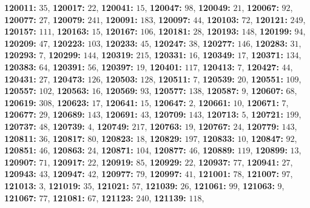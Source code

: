 \textsf{\bfseries 120011:} $35$, \textsf{\bfseries 120017:} $22$, \textsf{\bfseries 120041:} $15$, \textsf{\bfseries 120047:} $98$, \textsf{\bfseries 120049:} $21$, \textsf{\bfseries 120067:} $92$, \textsf{\bfseries 120077:} $27$, \textsf{\bfseries 120079:} $241$, \textsf{\bfseries 120091:} $183$, \textsf{\bfseries 120097:} $44$, \textsf{\bfseries 120103:} $72$, \textsf{\bfseries 120121:} $249$, \textsf{\bfseries 120157:} $111$, \textsf{\bfseries 120163:} $15$, \textsf{\bfseries 120167:} $106$, \textsf{\bfseries 120181:} $28$, \textsf{\bfseries 120193:} $148$, \textsf{\bfseries 120199:} $94$, \textsf{\bfseries 120209:} $47$, \textsf{\bfseries 120223:} $103$, \textsf{\bfseries 120233:} $45$, \textsf{\bfseries 120247:} $38$, \textsf{\bfseries 120277:} $146$, \textsf{\bfseries 120283:} $31$, \textsf{\bfseries 120293:} $7$, \textsf{\bfseries 120299:} $144$, \textsf{\bfseries 120319:} $215$, \textsf{\bfseries 120331:} $16$, \textsf{\bfseries 120349:} $17$, \textsf{\bfseries 120371:} $134$, \textsf{\bfseries 120383:} $64$, \textsf{\bfseries 120391:} $56$, \textsf{\bfseries 120397:} $19$, \textsf{\bfseries 120401:} $117$, \textsf{\bfseries 120413:} $7$, \textsf{\bfseries 120427:} $44$, \textsf{\bfseries 120431:} $27$, \textsf{\bfseries 120473:} $126$, \textsf{\bfseries 120503:} $128$, \textsf{\bfseries 120511:} $7$, \textsf{\bfseries 120539:} $20$, \textsf{\bfseries 120551:} $109$, \textsf{\bfseries 120557:} $102$, \textsf{\bfseries 120563:} $16$, \textsf{\bfseries 120569:} $93$, \textsf{\bfseries 120577:} $138$, \textsf{\bfseries 120587:} $9$, \textsf{\bfseries 120607:} $68$, \textsf{\bfseries 120619:} $308$, \textsf{\bfseries 120623:} $17$, \textsf{\bfseries 120641:} $15$, \textsf{\bfseries 120647:} $2$, \textsf{\bfseries 120661:} $10$, \textsf{\bfseries 120671:} $7$, \textsf{\bfseries 120677:} $29$, \textsf{\bfseries 120689:} $143$, \textsf{\bfseries 120691:} $43$, \textsf{\bfseries 120709:} $143$, \textsf{\bfseries 120713:} $5$, \textsf{\bfseries 120721:} $199$, \textsf{\bfseries 120737:} $48$, \textsf{\bfseries 120739:} $4$, \textsf{\bfseries 120749:} $217$, \textsf{\bfseries 120763:} $19$, \textsf{\bfseries 120767:} $24$, \textsf{\bfseries 120779:} $143$, \textsf{\bfseries 120811:} $36$, \textsf{\bfseries 120817:} $80$, \textsf{\bfseries 120823:} $18$, \textsf{\bfseries 120829:} $197$, \textsf{\bfseries 120833:} $10$, \textsf{\bfseries 120847:} $92$, \textsf{\bfseries 120851:} $46$, \textsf{\bfseries 120863:} $24$, \textsf{\bfseries 120871:} $104$, \textsf{\bfseries 120877:} $46$, \textsf{\bfseries 120889:} $119$, \textsf{\bfseries 120899:} $13$, \textsf{\bfseries 120907:} $71$, \textsf{\bfseries 120917:} $22$, \textsf{\bfseries 120919:} $85$, \textsf{\bfseries 120929:} $22$, \textsf{\bfseries 120937:} $77$, \textsf{\bfseries 120941:} $27$, \textsf{\bfseries 120943:} $43$, \textsf{\bfseries 120947:} $42$, \textsf{\bfseries 120977:} $79$, \textsf{\bfseries 120997:} $41$, \textsf{\bfseries 121001:} $78$, \textsf{\bfseries 121007:} $97$, \textsf{\bfseries 121013:} $3$, \textsf{\bfseries 121019:} $35$, \textsf{\bfseries 121021:} $57$, \textsf{\bfseries 121039:} $26$, \textsf{\bfseries 121061:} $99$, \textsf{\bfseries 121063:} $9$, \textsf{\bfseries 121067:} $77$, \textsf{\bfseries 121081:} $67$, \textsf{\bfseries 121123:} $240$, \textsf{\bfseries 121139:} $118$, 
